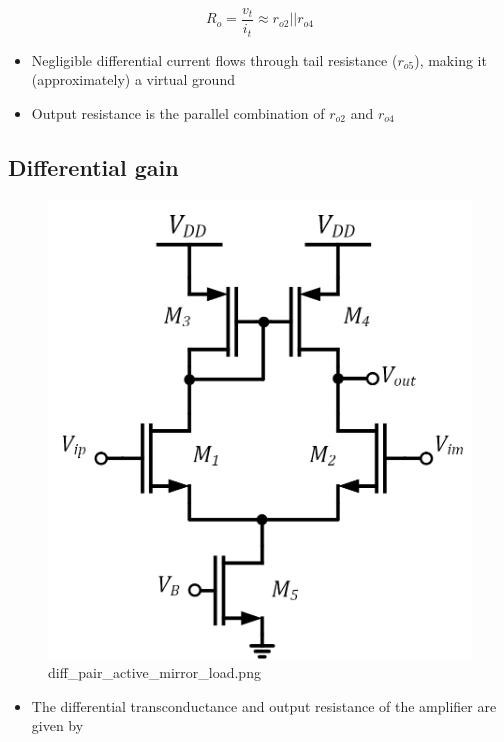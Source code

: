 \documentclass[11pt]{article}
\providecommand{\tightlist}{%
      \setlength{\itemsep}{0pt}\setlength{\parskip}{0pt}}
\begin{document}
\begin{equation}
\boxed{ R_o = \dfrac{v_t}{i_t} \approx r_{o2}||r_{o4} }
\end{equation}

    \begin{itemize}
\tightlist
\item
  Negligible differential current flows through tail resistance
  (\(r_{o5}\)), making it (approximately) a virtual ground
\item
  Output resistance is the parallel combination of \(r_{o2}\) and
  \(r_{o4}\)
\end{itemize}

    \hypertarget{differential-gain}{%
\subsection{Differential gain}\label{differential-gain}}

    \begin{figure}
\centering
\includegraphics{diff_pair_active_mirror_load.png}
\caption{diff\_pair\_active\_mirror\_load.png}
\end{figure}

    \begin{itemize}
\tightlist
\item
  The differential transconductance and output resistance of the
  amplifier are given by
\end{itemize}
\end{document}
